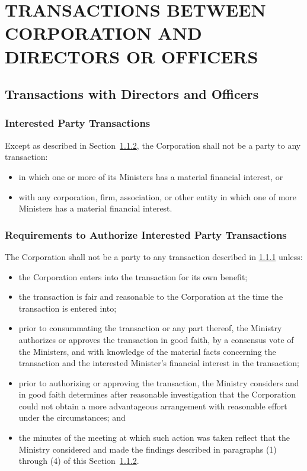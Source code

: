 \documentclass[letterpaper,titlepage]{article}
\begin{document}
\section{TRANSACTIONS BETWEEN CORPORATION AND DIRECTORS OR OFFICERS}
\label{sec:transactionsBetween}
\subsection{Transactions with Directors and Officers}
\label{sec:transactionsWith}
\subsubsection{Interested Party Transactions}
\label{sec:interestedParty}
Except as described in Section~\ref{sec:requirementsAuthorize}, the Corporation
shall not be a party to any transaction:
\begin{itemize}
    \item[(1)] in which one or more of its Ministers has a material financial
        interest, or
    \item[(2)] with any corporation, firm, association, or other entity in which one
        of more Ministers has a material financial interest.
\end{itemize}
\subsubsection{Requirements to Authorize Interested Party Transactions}
\label{sec:requirementsAuthorize}
The Corporation shall not be a party to any transaction described in
\ref{sec:interestedParty} unless:
\begin{itemize}
    \item[(1)] the Corporation enters into the transaction for its own benefit;
    \item[(2)] the transaction is fair and reasonable to the Corporation at the time
        the transaction is entered into;
    \item[(3)] prior to consummating the transaction or any part thereof, the
        Ministry authorizes or approves the transaction in good faith, by a
        consensus vote of the Ministers, and with knowledge of the material
        facts concerning the transaction and the interested Minister's
        financial interest in the transaction;
    \item[(4)] prior to authorizing or approving the transaction, the Ministry
        considers and in good faith determines after reasonable investigation
        that the Corporation could not obtain a more advantageous arrangement
        with reasonable effort under the circumstances; and
    \item[(5)] the minutes of the meeting at which such action was taken reflect
        that the Ministry considered and made the findings described in
        paragraphs (1) through (4) of this
        Section~\ref{sec:requirementsAuthorize}.
\end{itemize}
\end{document}
